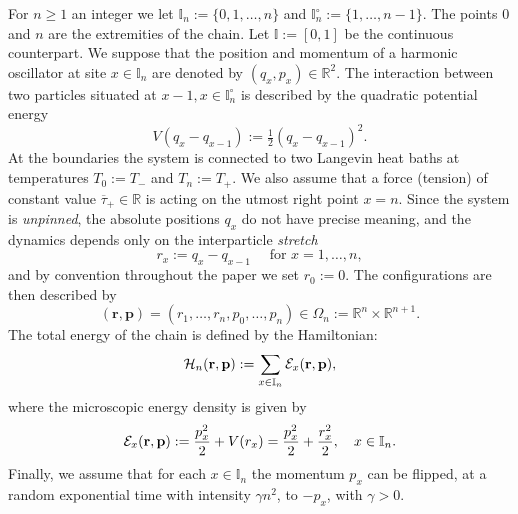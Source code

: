 \documentclass[EJP]{ejpecp} %
\newcommand\R{{\mathbb R}}
\newcommand\RR{{\mathbb R}}
\newcommand\T{{\mathbb I}}
\newcommand \ga{\gamma}
\renewcommand{\ge}{\geqslant}
\renewcommand{\bar}{\overline}
\numberwithin{equation}{section}
\begin{document}
For $n\ge1$  an integer we let  $\T_n := \{0,1,\dots,n\}$ and
  $\T_n^{\circ} := \{1,\dots,n-1\}$. The points $0$ and $n$ are the extremities of the chain. Let $\T := [0,1]$ be the continuous counterpart.
We suppose that the position and momentum of a harmonic oscillator at
site $x\in\T_n$ are denoted by $(q_x,p_x)\in\R^2$.
The interaction
between two particles situated at $x-1,x\in\T_n^{\circ}$ is described by the quadratic
potential energy \[V(q_x-q_{x-1}):=\tfrac12(q_x-q_{x-1})^2.\]  
%
At the boundaries the system
is connected to two Langevin heat baths at temperatures $T_0:=T_-$ and
$T_n:=T_+$.
 We also assume that a force (tension) of constant value
$\bar\tau_+ \in \RR$ is acting on the utmost right point $x=n$. Since the system is \emph{unpinned}, the absolute positions $q_x$ 
do not have precise meaning, and the dynamics depends only on the
interparticle {\em stretch} 
\[
r_x := q_x - q_{x-1} \quad \text{ for } x=1,\ldots,n, 
\]and by convention throughout the paper we set $r_0:=0$.
The configurations are then described by
\begin{equation}
  \label{eq:1}
  (\mathbf r, \mathbf p) = (r_1, \dots, r_n, p_0, \dots, p_n) \in \Omega_n:=\R^{n}\times\R^{n+1}. 
\end{equation}
The total energy of the chain is defined by the Hamiltonian:
\begin{equation}
\label{Hn}
\mathcal{H}_n (\mathbf r, \mathbf p):=\sum_{x\in\T_n} {\cal E}_x (\mathbf r, \mathbf p),
\end{equation}
where the microscopic energy density is given by
\begin{equation}
\label{Ex}
{\cal E}_x (\mathbf r, \mathbf p):=  \frac{p_x^2}{2}+V(r_x)= \frac{p_x^2}2 + \frac{r_{x}^2}2 ,\quad x\in \T_n .
\end{equation}
Finally, we assume that for each $x \in \T_n$ the momentum $p_x$ can be flipped, at a random
exponential time with intensity $\ga n^2$, to $-p_x$, with
$\ga>0$. 
\end{document}

